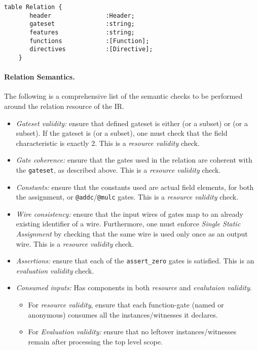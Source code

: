\begin{lstlisting}[style=fbslisting]
    table Relation {
       header               :Header;
       gateset              :string;
       features             :string;
       functions            :[Function];
       directives           :[Directive];
    }
\end{lstlisting}

\paragraph{Relation Semantics.} The following is a comprehensive list of the semantic checks to be performed around the relation resource of the IR.

\begin{itemize}
    \item \textit{Gateset validity:} ensure that defined gateset is either  (or a subset) or  (or a subset). If the gateset is  (or a subset), one must check that the field characteristic is exactly 2. This is a \textit{resource validity} check.
    \item \textit{Gate coherence:} ensure that the gates used in the relation are coherent with the \texttt{gateset}, as described above. This is a \textit{resource validity} check.
    \item \textit{Constants:} ensure that the constants used are actual field elements, for both the assignment, or \texttt{@addc}/\texttt{@mulc} gates. This is a \textit{resource validity} check.
    \item \textit{Wire consistency:} ensure that the input wires of gates map to an already existing identifier of a wire. Furthermore, one must enforce \textit{Single Static Assignment} by checking that the same wire is used only once as an output wire.  This is a \textit{resource validity} check.
    \item \textit{Assertions:} ensure that each of the \texttt{assert\_zero} gates is satisfied.  This is an \textit{evaluation validity} check.
    \item \textit{Consumed inputs:} Has components in both \textit{resource} and \textit{evalutaion validity}.
    \begin{itemize}
        \item For \textit{resource validity}, ensure that each function-gate (named or anonymous) consumes all the instances/witnesses it declares.
        \item For \textit{Evaluation validity:} ensure that no leftover instances/witnesses remain after processing the top level scope. 
    \end{itemize}
\end{itemize}

